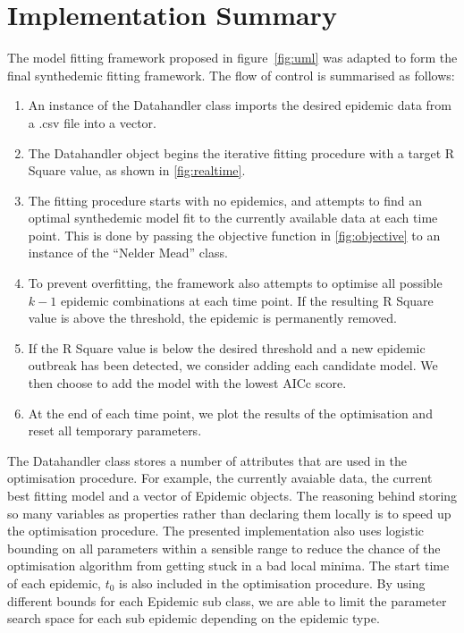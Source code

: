 \section{Implementation Summary}
The model fitting framework proposed in figure~\ref{fig:uml} was
adapted to form the final synthedemic fitting framework. The flow of
control is summarised as follows:

\begin{enumerate}
\item An instance of the Datahandler class imports the desired
  epidemic data from a .csv file into a vector.
\item The Datahandler object begins the iterative fitting procedure
  with a target R Square value, as shown in \ref{fig:realtime}.
\item The fitting procedure starts with no epidemics, and attempts to
  find an optimal synthedemic model fit to the currently available
  data at each time point. This is done by passing the objective
  function in \ref{fig:objective} to an instance of the ``Nelder
  Mead'' class.
\item To prevent overfitting, the framework also attempts to optimise
  all possible $k-1$ epidemic combinations at each time point. If the
  resulting R Square value is above the threshold, the epidemic is
  permanently removed.
\item If the R Square value is below the desired threshold and a new
  epidemic outbreak has been detected, we
  consider adding each candidate model. We then choose to add the
  model with the lowest AICc score.
\item At the end of each time point, we plot the results of the
  optimisation and reset all temporary parameters.
\end{enumerate}

The Datahandler class stores a number of attributes that are used in the
optimisation procedure. For example, the currently avaiable data, the current best
fitting model and a vector of Epidemic objects. The reasoning behind
storing so many variables as properties rather than declaring them
locally is to speed up the optimisation procedure. The presented
implementation also uses logistic bounding on all parameters within a
sensible range to reduce the chance of the optimisation algorithm from
getting stuck in a bad local minima. The start time of each epidemic,
$t_0$ is also included in the optimisation procedure. By using
different bounds for each Epidemic sub class, we are able to limit the
parameter search space for each sub epidemic depending on the epidemic
type.

